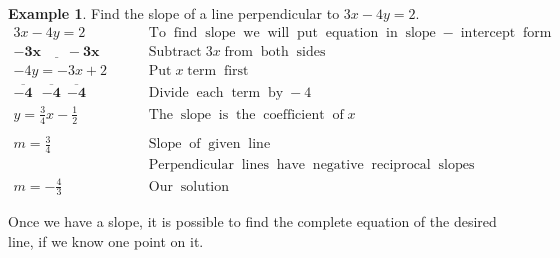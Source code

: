 \documentclass[12pt]{book}
\theoremstyle{definition}
\newtheorem{example}{Example}
\newcommand{\tmmathbf}[1]{\ensuremath{\boldsymbol{#1}}}
\newcommand{\tmop}[1]{\ensuremath{\operatorname{#1}}}
\begin{document}
\begin{example}\label{Lin70} Find the slope of a line perpendicular to $3 x - 4 y = 2$.
  \begin{eqnarray*}
    3 x - 4 y = 2~~~~ &  & \tmop{To} \tmop{find} \tmop{slope} \tmop{we}
    \tmop{will} \tmop{put} \tmop{equation} \tmop{in} \tmop{slope} -
    \tmop{intercept} \tmop{form}\\
    \tmmathbf{\underline{- 3 x ~~~~~~~~- 3 x}} &  & \tmop{Subtract} 3 x \tmop{from} \tmop{both}
    \tmop{sides}\\
    - 4 y = - 3 x + 2~~~~~ &  & \tmop{Put} x \tmop{term} \tmop{first}\\
    \tmmathbf{\overline{- 4} ~~~ \overline{- 4} ~~ \overline{- 4}}~~~~~ &  & \tmop{Divide}
    \tmop{each} \tmop{term} \tmop{by} - 4\\
    y = \frac{3}{4} x - \frac{1}{2}~~~~ &  & \tmop{The} \tmop{slope} \tmop{is}
    \tmop{the} \tmop{coefficient} \tmop{of} x\\
    &  & \\
    m = \frac{3}{4}~~~~ &  & \tmop{Slope} \tmop{of} \tmop{given} \tmop{line}\\
		& & \tmop{Perpendicular} \tmop{lines} \tmop{have} \tmop{negative}
    \tmop{reciprocal} \tmop{slopes}\\
    m = - \frac{4}{3}~~~~ &  & \tmop{Our} \tmop{solution}
  \end{eqnarray*}
\end{example}
Once we have a slope, it is possible to find the complete equation of the desired line, if we know one point on it.
\end{document}
